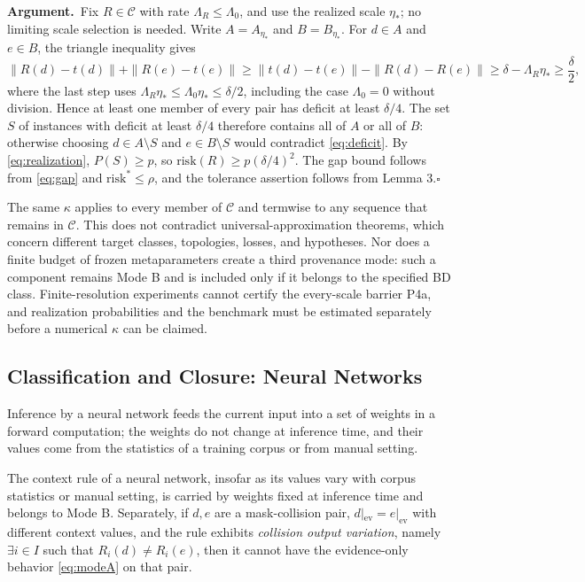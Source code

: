 \documentclass[twoside,11pt]{article}
\newcommand{\argument}{\par\medskip\noindent\textbf{Argument.}\ }
\newcommand{\qedbox}{\hfill$\square$}
\newcommand{\ev}{\mathrm{ev}}
\begin{document}
\argument Fix $R\in\mathcal{C}$ with rate $\Lambda_R\leq\Lambda_0$, and use the realized scale $\eta_*$; no limiting scale selection is needed. Write $A=A_{\eta_*}$ and $B=B_{\eta_*}$. For $d\in A$ and $e\in B$, the triangle inequality gives
\begin{equation}
\|R(d)-t(d)\|+\|R(e)-t(e)\|\geq\|t(d)-t(e)\|-\|R(d)-R(e)\|\geq\delta-\Lambda_R\eta_*\geq\frac{\delta}{2},
\label{eq:deficit}
\end{equation}
where the last step uses $\Lambda_R\eta_*\leq\Lambda_0\eta_*\leq\delta/2$, including the case $\Lambda_0=0$ without division. Hence at least one member of every pair has deficit at least $\delta/4$. The set $S$ of instances with deficit at least $\delta/4$ therefore contains all of $A$ or all of $B$: otherwise choosing $d\in A\setminus S$ and $e\in B\setminus S$ would contradict \eqref{eq:deficit}. By \eqref{eq:realization}, $P(S)\geq p$, so $\mathrm{risk}(R)\geq p(\delta/4)^2$. The gap bound follows from \eqref{eq:gap} and $\mathrm{risk}^*\leq\rho$, and the tolerance assertion follows from Lemma 3.\qedbox

The same $\kappa$ applies to every member of $\mathcal{C}$ and termwise to any sequence that remains in $\mathcal{C}$. This does not contradict universal-approximation theorems, which concern different target classes, topologies, losses, and hypotheses. Nor does a finite budget of frozen metaparameters create a third provenance mode: such a component remains Mode B and is included only if it belongs to the specified BD class. Finite-resolution experiments cannot certify the every-scale barrier P4a, and realization probabilities and the benchmark must be estimated separately before a numerical $\kappa$ can be claimed.

\subsection{Classification and Closure: Neural Networks}

Inference by a neural network feeds the current input into a set of weights in a forward computation; the weights do not change at inference time, and their values come from the statistics of a training corpus or from manual setting.

\begin{proposition}
The context rule of a neural network, insofar as its values vary with corpus statistics or manual setting, is carried by weights fixed at inference time and belongs to Mode B. Separately, if $d,e$ are a mask-collision pair, $d|_{\ev}=e|_{\ev}$ with different context values, and the rule exhibits \emph{collision output variation}, namely $\exists i\in I$ such that $R_i(d)\neq R_i(e)$, then it cannot have the evidence-only behavior \eqref{eq:modeA} on that pair.
\end{proposition}
\end{document}
